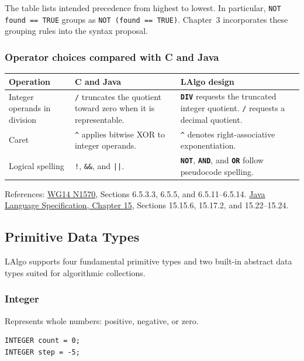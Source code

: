 \documentclass[11pt,a4paper]{article}
\newcommand{\kw}[1]{\texttt{\bfseries\color{pupmaroon}#1}}
\newcommand{\codeinline}[1]{\texttt{#1}}
\begin{document}
The table lists intended precedence from highest to lowest. In particular, \codeinline{NOT found == TRUE} groups as \codeinline{NOT (found == TRUE)}. Chapter~3 incorporates these grouping rules into the syntax proposal.

\subsubsection*{Operator choices compared with C and Java}

\begin{tabularx}{\linewidth}{@{}L{28mm}YY@{}}
\toprule
\textbf{Operation} & \textbf{C and Java} & \textbf{LAlgo design} \\
\midrule
Integer operands in division & \codeinline{/} truncates the quotient toward zero when it is representable. & \kw{DIV} requests the truncated integer quotient. \codeinline{/} requests a decimal quotient. \\
Caret & \codeinline{\textasciicircum} applies bitwise XOR to integer operands. & \codeinline{\textasciicircum} denotes right-associative exponentiation. \\
Logical spelling & \codeinline{!}, \codeinline{\&\&}, and \codeinline{||}. & \kw{NOT}, \kw{AND}, and \kw{OR} follow pseudocode spelling. \\
\bottomrule
\end{tabularx}

{\footnotesize References: \href{https://www.open-std.org/jtc1/sc22/wg14/www/docs/n1570.pdf}{WG14 N1570}, Sections 6.5.3.3, 6.5.5, and 6.5.11--6.5.14.
\href{https://docs.oracle.com/javase/specs/jls/se25/html/jls-15.html}{Java Language Specification, Chapter 15}, Sections 15.15.6, 15.17.2, and 15.22--15.24.}

\subsection{Primitive Data Types}

LAlgo supports four fundamental primitive types and two built-in abstract data types suited for algorithmic collections.

\subsubsection{Integer}

Represents whole numbers: positive, negative, or zero.

\begin{lstlisting}
INTEGER count = 0;
INTEGER step = -5;
\end{lstlisting}
\end{document}
